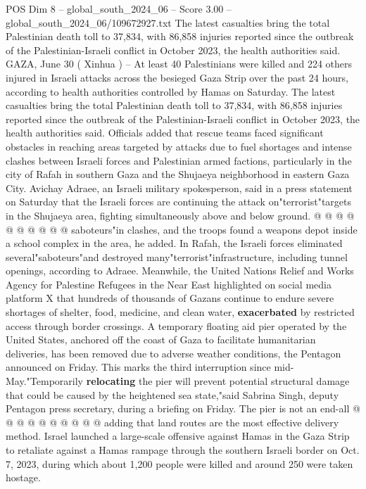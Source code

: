 \begin{textsample}{POS Dim 8 – global\_south\_2024\_06 – Score 3.00 – global\_south\_2024\_06/109672927.txt}  \label{ex:f8_pos_404}
The latest casualties bring the total Palestinian death toll to 37,834, with 86,858 injuries reported since the outbreak of the Palestinian-Israeli conflict in October 2023, the health authorities said.
GAZA, June 30 ( Xinhua ) -- At least 40 Palestinians were killed and 224 others injured in Israeli attacks across the besieged Gaza Strip over the past 24 hours, according to health authorities controlled by Hamas on Saturday.
The latest casualties bring the total Palestinian death toll to 37,834, with 86,858 injuries reported since the outbreak of the Palestinian-Israeli conflict in October 2023, the health authorities said.
Officials added that rescue teams faced significant obstacles in reaching areas targeted by attacks due to fuel shortages and intense clashes between Israeli forces and Palestinian armed factions, particularly in the city of Rafah in southern Gaza and the Shujaeya neighborhood in eastern Gaza City.
Avichay Adraee, an Israeli military spokesperson, said in a press statement on Saturday that the Israeli forces are continuing the attack on"terrorist"targets in the Shujaeya area, fighting simultaneously above and below ground. @ @ @ @ @ @ @ @ @ @ saboteurs"in clashes, and the troops found a weapons depot inside a school complex in the area, he added.
In Rafah, the Israeli forces eliminated several"saboteurs"and destroyed many"terrorist"infrastructure, including tunnel openings, according to Adraee.
Meanwhile, the United Nations Relief and Works Agency for Palestine Refugees in the Near East highlighted on social media platform X that hundreds of thousands of Gazans continue to endure severe shortages of shelter, food, medicine, and clean water, \textbf{exacerbated} by restricted access through border crossings.
A temporary floating aid pier operated by the United States, anchored off the coast of Gaza to facilitate humanitarian deliveries, has been removed due to adverse weather conditions, the Pentagon announced on Friday.
This marks the third interruption since mid-May."Temporarily \textbf{relocating} the pier will prevent potential structural damage that could be caused by the heightened sea state,"said Sabrina Singh, deputy Pentagon press secretary, during a briefing on Friday.
The pier is not an end-all @ @ @ @ @ @ @ @ @ @ adding that land routes are the most effective delivery method.
Israel launched a large-scale offensive against Hamas in the Gaza Strip to retaliate against a Hamas rampage through the southern Israeli border on Oct. 7, 2023, during which about 1,200 people were killed and around 250 were taken hostage.

\end{textsample}
